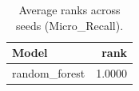 \begin{table}[t]
\centering
\begin{tabular}{lr}
\toprule
Model & rank \\
\midrule
random_forest & 1.0000 \\
\bottomrule
\end{tabular}
\caption{Average ranks across seeds (Micro_Recall).}
\label{tab:avg_rank_Micro_Recall}
\end{table}